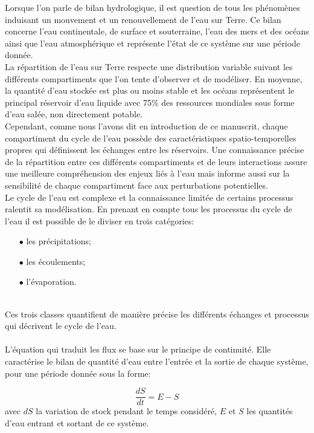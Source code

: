 \noindent Lorsque l'on parle de bilan hydrologique, il est question de tous les phénomènes induisant un mouvement et un renouvellement de l'eau sur Terre. Ce bilan concerne l'eau continentale, de surface et souterraine, l'eau des mers et des océans ainsi que l'eau atmosphérique et représente l'état de ce système sur une période donnée. \\
La répartition de l'eau sur Terre respecte une distribution variable suivant les différents compartiments que l'on tente d'observer et de modéliser. En moyenne, la quantité d'eau stockée est plus ou moins stable et les océans représentent le principal réservoir d'eau liquide avec 75\% des ressources mondiales sous forme d'eau salée, non directement potable.\\ Cependant, comme nous l'avons dit en introduction de ce manuscrit, chaque compartiment du cycle de l'eau possède des caractéristiques spatio-temporelles propres qui définissent les échanges entre les réservoirs. Une connaissance précise de la répartition entre ces différents compartiments et de leurs interactions assure une meilleure compréhension des enjeux liés à l'eau mais informe aussi sur la sensibilité de chaque compartiment face aux perturbations potentielles.\\

Le cycle de l'eau est complexe et la connaissance limitée de certains processus ralentit sa modélisation. En prenant en compte tous les processus du cycle de l'eau il est possible de le diviser en trois catégories: \\

\begin{itemize}
\item[$\bullet$] les précipitations;
\item[$\bullet$] les écoulements;
\item[$\bullet$] l'évaporation.
\end{itemize}
~\\
Ces trois classes quantifient de manière précise les différents échanges et processus qui décrivent le cycle de l'eau. \\
~\\
L'équation qui traduit les flux se base sur le principe de continuité. Elle caractérise le bilan de quantité d'eau entre l'entrée et la sortie de chaque système, pour une période donnée sous la forme: 

\begin{equation}
\frac{dS}{dt} = E - S 
\end{equation}
avec ${dS}$ la variation de stock pendant le temps considéré, $E$ et $S$ les quantités d'eau entrant et sortant de ce système. \\

